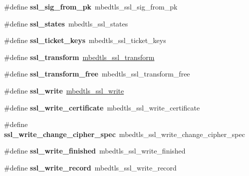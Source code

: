 \begin{DoxyCompactItemize}
\#define {\bfseries ssl\+\_\+sig\+\_\+from\+\_\+pk}~mbedtls\+\_\+ssl\+\_\+sig\+\_\+from\+\_\+pk
\item 
\mbox{\label{compat-1_83_8h_ac86eb64b27adff2a5874688ed1be4801}} 
\#define {\bfseries ssl\+\_\+states}~mbedtls\+\_\+ssl\+\_\+states
\item 
\mbox{\label{compat-1_83_8h_ab87271b1b85dd842143054c087b6b261}} 
\#define {\bfseries ssl\+\_\+ticket\+\_\+keys}~mbedtls\+\_\+ssl\+\_\+ticket\+\_\+keys
\item 
\mbox{\label{compat-1_83_8h_ac11d0a93de78e8264834d61387da035f}} 
\#define {\bfseries ssl\+\_\+transform}~\mbox{\hyperlink{structmbedtls__ssl__transform}{mbedtls\+\_\+ssl\+\_\+transform}}
\item 
\mbox{\label{compat-1_83_8h_a37e6f049a1d90375cba29b1b70b16312}} 
\#define {\bfseries ssl\+\_\+transform\+\_\+free}~mbedtls\+\_\+ssl\+\_\+transform\+\_\+free
\item 
\mbox{\label{compat-1_83_8h_a4b0a5d96aa56f5d098a6a812738469a8}} 
\#define {\bfseries ssl\+\_\+write}~\mbox{\hyperlink{ssl_8h_a5bbda87d484de82df730758b475f32e5}{mbedtls\+\_\+ssl\+\_\+write}}
\item 
\mbox{\label{compat-1_83_8h_a28f9aa80c61ed69cbe79ab926ce4f8ce}} 
\#define {\bfseries ssl\+\_\+write\+\_\+certificate}~mbedtls\+\_\+ssl\+\_\+write\+\_\+certificate
\item 
\mbox{\label{compat-1_83_8h_ab4fdbd31e56e771f9328906472df02f8}} 
\#define {\bfseries ssl\+\_\+write\+\_\+change\+\_\+cipher\+\_\+spec}~mbedtls\+\_\+ssl\+\_\+write\+\_\+change\+\_\+cipher\+\_\+spec
\item 
\mbox{\label{compat-1_83_8h_a356456d3c457d83ac7c6a014946d178a}} 
\#define {\bfseries ssl\+\_\+write\+\_\+finished}~mbedtls\+\_\+ssl\+\_\+write\+\_\+finished
\item 
\mbox{\label{compat-1_83_8h_a7683a1ef7d7e3e5cdda9ea3a4cc8466d}} 
\#define {\bfseries ssl\+\_\+write\+\_\+record}~mbedtls\+\_\+ssl\+\_\+write\+\_\+record
\item 

\end{DoxyCompactItemize}
